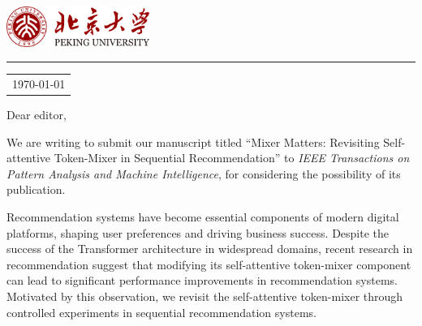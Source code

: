 \documentclass{article}
\newcommand{\journal}{IEEE Transactions on Pattern Analysis and Machine Intelligence}
\newcommand{\papertitle}{Mixer Matters: Revisiting Self-attentive Token-Mixer in Sequential Recommendation}
\begin{document}
\includegraphics[width=0.35\textwidth]{pku_logo.png} %
\vspace{-1em} %
\rule{\linewidth}{1pt} %
\bigskip\bigskip %


\hfill
\begin{tabular}{l @{}}
\hfill \today \bigskip\\ %
\end{tabular}

\bigskip %



\bigskip %

Dear editor,

\bigskip %


We are writing to submit our manuscript titled “\papertitle” to \textit{\journal}, for considering the possibility of its publication. 

Recommendation systems have become essential components of modern digital platforms, shaping user preferences and driving business success. Despite the success of the Transformer architecture in widespread domains, recent research in recommendation suggest that modifying its self-attentive token-mixer component can lead to significant performance improvements in recommendation systems. Motivated by this observation, we revisit the self-attentive token-mixer through controlled experiments in sequential recommendation systems. 
\end{document}
